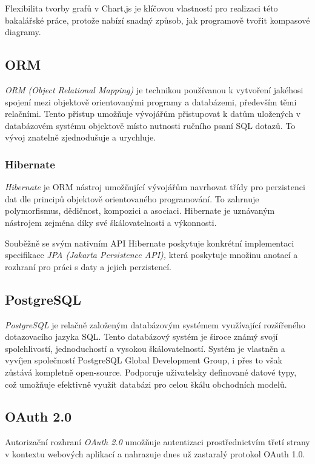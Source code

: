 Flexibilita tvorby grafů v Chart.js je klíčovou vlastností pro realizaci této bakalářské práce,
protože nabízí snadný způsob, jak programově tvořit kompasové diagramy.

\subsection{ORM}
\label{subsection:orm}
\textit{ORM (Object Relational Mapping)} je technikou používanou k vytvoření jakéhosi spojení
mezi objektově orientovanými programy a databázemi, především těmi relačními. Tento přístup
umožňuje vývojářům přistupovat k datům uložených v databázovém systému objektově místo nutnosti
ručního psaní SQL dotazů. To vývoj znatelně zjednodušuje a urychluje.~\cite{freecodecamp}

\subsubsection{Hibernate}
\label{subsection:hibernate}
\textit{Hibernate} je ORM nástroj umožňující vývojářům navrhovat třídy pro perzistenci dat
dle principů objektově orientovaného programování. To zahrnuje polymorfismus, dědičnost, kompozici a asociaci.
Hibernate je uznávaným nástrojem zejména díky své škálovatelnosti a výkonnosti.~\cite{freecodecamp}

Souběžně se svým nativním API Hibernate poskytuje konkrétní implementaci specifikace \textit{JPA (Jakarta Persistence API),}
která poskytuje množinu anotací a rozhraní pro práci s daty a jejich perzistencí.~\cite{hibernate}

\subsection{PostgreSQL}
\label{subsection:postgresql}
\textit{PostgreSQL} je relačně založeným databázovým systémem využívající rozšířeného dotazovacího jazyka SQL. Tento databázový systém je široce známý svojí spolehlivostí, jednoduchostí a vysokou škálovatelností. Systém je vlastněn a vyvíjen společností PostgreSQL Global Development Group, i přes to však zůstává kompletně open-source. Podporuje uživatelsky definované datové typy, což umožňuje efektivně využít databázi pro celou škálu obchodních modelů.\cite{postgresql} 

\subsection{OAuth 2.0}
Autorizační rozhraní \textit{OAuth 2.0} umožňuje autentizaci prostřednictvím třetí strany
v kontextu webových aplikací a nahrazuje dnes už zastaralý protokol OAuth 1.0.

